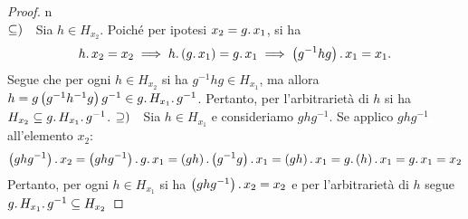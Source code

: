 \begin{proof}{n}~{}\\
$\subseteq)\quad$Sia $h\in H_{x_2}$. Poiché  per ipotesi $x_2=g\ldotp x_1$, si ha
\begin{equation*}
h\ldotp x_2 = x_2\implies h\ldotp\left(g\ldotp x_1\right) = g\ldotp x_1 \implies \left(g^{-1} h g\right)\ldotp x_1 = x_1.
\end{equation*}
Segue che per ogni $h\in H_{x_2}$ si ha $g^{-1} h g\in H_{x_1}$, ma allora $h = g \left(g^{-1} h^{-1} g\right) g^{-1}\in g\ldotp H_{x_1}\ldotp g^{-1}$. Pertanto, per l'arbitrarietà di $h$ si ha $H_{x_2} \subseteq g \ldotp H_{x_1}\ldotp g^{-1}$.
$\supseteq)\quad$Sia $h\in H_{x_1}$ e consideriamo $ghg^{-1}$. Se applico $ghg^{-1}$ all'elemento $x_2$:
\begin{equation*}
\left(ghg^{-1}\right)\ldotp x_2=\left(ghg^{-1}\right)\ldotp g\ldotp x_1=\left(gh\right)\ldotp \left(g^{-1}g\right)\ldotp x_1=\left(gh\right)\ldotp x_1=g\ldotp\left(h\right)\ldotp x_1=g\ldotp x_1=x_2
\end{equation*}
Pertanto, per ogni $h\in H_{x_1}$ si ha $\left(ghg^{-1}\right)\ldotp x_2= x_2$ e per l'arbitrarietà di $h$ segue $g\ldotp H_{x_1}\ldotp g^{-1}\subseteq H_{x_2}$
\end{proof}
